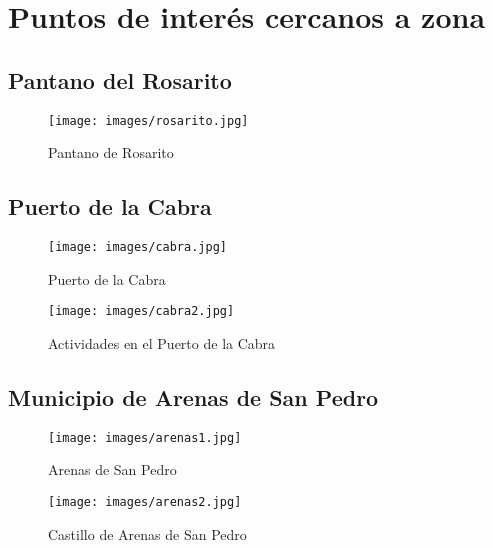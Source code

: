 \chapter{Puntos de interés cercanos a zona}
\label{chap:interes}

\section{Pantano del Rosarito}
\label{sec:rosarito}

\begin{figure}[h]
  \begin{center}
    \texttt{[image: images/rosarito.jpg]}
    \caption{Pantano de Rosarito}
    \label{fig:rosarito}
  \end{center}
\end{figure}

\section{Puerto de la Cabra}
\label{sec:cabra}

\begin{figure}[h]
  \begin{center}
    \texttt{[image: images/cabra.jpg]}
    \caption{Puerto de la Cabra}
    \label{fig:cabra}
  \end{center}
\end{figure}

\begin{figure}[h]
  \begin{center}
    \texttt{[image: images/cabra2.jpg]}
    \caption{Actividades en el Puerto de la Cabra}
    \label{fig:cabra2}
  \end{center}
\end{figure}

\newpage
\section{Municipio de Arenas de San Pedro}
\label{sec:arenas}


\begin{figure}[h]
    \texttt{[image: images/arenas1.jpg]}
    \caption{Arenas de San Pedro}
    \label{fig:arenas1}
\end{figure}

\begin{figure}[h]
  \begin{center}
    \texttt{[image: images/arenas2.jpg]}
    \caption{Castillo de Arenas de San Pedro}
    \label{fig:arenas2}
  \end{center}
\end{figure}

